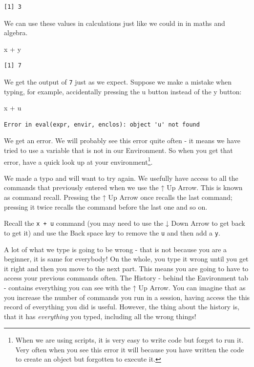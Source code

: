\documentclass[
  letterpaper,
  DIV=11,
  numbers=noendperiod]{scrreprt}
\newenvironment{Shaded}{\begin{snugshade}}{\end{snugshade}}
\newcommand{\NormalTok}[1]{\textcolor[rgb]{0.00,0.23,0.31}{#1}}
\newcommand{\SpecialCharTok}[1]{\textcolor[rgb]{0.37,0.37,0.37}{#1}}
\begin{document}
\begin{verbatim}
[1] 3
\end{verbatim}

We can use these values in calculations just like we could in in maths
and algebra.

\begin{Shaded}
\begin{Highlighting}[]
\NormalTok{x }\SpecialCharTok{+}\NormalTok{ y}
\end{Highlighting}
\end{Shaded}

\begin{verbatim}
[1] 7
\end{verbatim}

We get the output of \texttt{7} just as we expect. Suppose we make a
mistake when typing, for example, accidentally pressing the u button
instead of the y button:

\begin{Shaded}
\begin{Highlighting}[]
\NormalTok{x }\SpecialCharTok{+}\NormalTok{ u}
\end{Highlighting}
\end{Shaded}

\begin{verbatim}
Error in eval(expr, envir, enclos): object 'u' not found
\end{verbatim}

We get an error. We will probably see this error quite often - it means
we have tried to use a variable that is not in our Environment. So when
you get that error, have a quick look up at your environment\footnote{When
  we are using scripts, it is very easy to write code but forget to run
  it. Very often when you see this error it will because you have
  written the code to create an object but forgotten to execute it.}.

We made a typo and will want to try again. We usefully have access to
all the commands that previously entered when we use the ↑ Up Arrow.
This is known as command recall. Pressing the ↑ Up Arrow once recalls
the last command; pressing it twice recalls the command before the last
one and so on.

Recall the \texttt{x\ +\ u} command (you may need to use the ↓ Down
Arrow to get back to get it) and use the Back space key to remove the
\texttt{u} and then add a \texttt{y}.

A lot of what we type is going to be wrong - that is not because you are
a beginner, it is same for everybody! On the whole, you type it wrong
until you get it right and then you move to the next part. This means
you are going to have to access your previous commands often. The
History - behind the Environment tab - contains everything you can see
with the ↑ Up Arrow. You can imagine that as you increase the number of
commands you run in a session, having access the this record of
everything you did is useful. However, the thing about the history is,
that it has \emph{everything} you typed, including all the wrong things!
\end{document}
